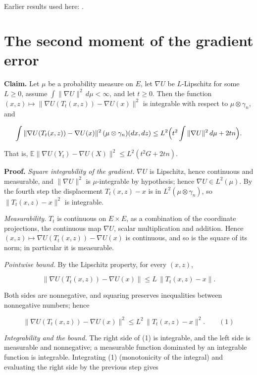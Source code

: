 \documentclass[11pt,a4paper]{article}
\begin{document}
Earlier results used here: \cite[Section~3.34.1]{LangevinLean2026ULASC}.

\section{\texorpdfstring{The second moment of the gradient error}{The second moment of the gradient error}}


\textbf{Claim.} Let \(\mu\) be a probability measure on \(E\), let \(\nabla U\) be \(L\)-Lipschitz for some \(L\ge0\), assume \(\int\|\nabla U\|^2\,d\mu<\infty\), and let \(t\ge0\). Then the function \((x,z)\mapsto\|\nabla U(T_t(x,z))-\nabla U(x)\|^2\) is integrable with respect to \(\mu\otimes\gamma_n\), and


\[\int\|\nabla U(T_t(x,z))-\nabla U(x)\|^2\,(\mu\otimes\gamma_n)(dx,dz)\le L^2\Bigl(t^2\int\|\nabla U\|^2\,d\mu+2tn\Bigr).\]


That is, \(\mathbb E\|\nabla U(Y_t)-\nabla U(X)\|^2\le L^2(t^2G+2tn)\).




\textbf{Proof.} \emph{Square integrability of the gradient.} \(\nabla U\) is Lipschitz, hence continuous and measurable, and \(\|\nabla U\|^2\) is \(\mu\)-integrable by hypothesis; hence \(\nabla U\in L^2(\mu)\). By the fourth step the displacement \(T_t(x,z)-x\) is in \(L^2(\mu\otimes\gamma_n)\), so \(\|T_t(x,z)-x\|^2\) is integrable.




\emph{Measurability.} \(T_t\) is continuous on \(E\times E\), as a combination of the coordinate projections, the continuous map \(\nabla U\), scalar multiplication and addition. Hence \((x,z)\mapsto\nabla U(T_t(x,z))-\nabla U(x)\) is continuous, and so is the square of its norm; in particular it is measurable.




\emph{Pointwise bound.} By the Lipschitz property, for every \((x,z)\),


\[\|\nabla U(T_t(x,z))-\nabla U(x)\|\le L\,\|T_t(x,z)-x\|.\]


Both sides are nonnegative, and squaring preserves inequalities between nonnegative numbers; hence


\[\|\nabla U(T_t(x,z))-\nabla U(x)\|^2\le L^2\,\|T_t(x,z)-x\|^2.\qquad(1)\]


\emph{Integrability and the bound.} The right side of (1) is integrable, and the left side is measurable and nonnegative; a measurable function dominated by an integrable function is integrable. Integrating (1) (monotonicity of the integral) and evaluating the right side by the previous step gives
\end{document}
